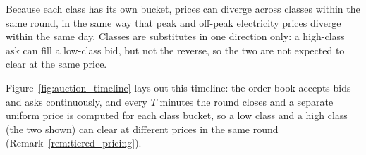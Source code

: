 \begin{remark}
\label{rem:tiered_pricing}
Because each class has its own bucket, prices can diverge across classes
within the same round, in the same way that peak and off-peak electricity
prices diverge within the same day. Classes are substitutes in one direction
only: a high-class ask can fill a low-class bid, but not the reverse, so the
two are not expected to clear at the same price.
\end{remark}

Figure~\ref{fig:auction_timeline} lays out this timeline: the order book
accepts bids and asks continuously, and every $T$ minutes the round closes
and a separate uniform price is computed for each class bucket, so a low
class and a high class (the two shown) can clear at different prices in the
same round (Remark~\ref{rem:tiered_pricing}).


